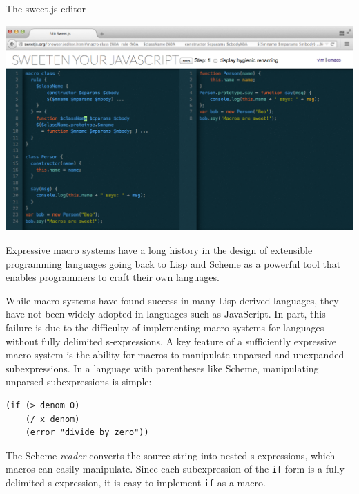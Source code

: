 \documentclass[preprint,10pt]{sigplanconf}
\begin{document}
\begin{displayfigure*}{\label{fig:editor}The sweet.js editor}

\centering
\includegraphics[scale=0.44]{sweetjs_browser.png}
\end{displayfigure*}

Expressive macro systems have a long history in the design of
extensible programming languages going back to Lisp and Scheme
\cite{Kohlbecker1987,Foderaro1983} as a powerful tool that enables
programmers to craft their own languages.

While macro systems have found success in many Lisp-derived languages,
they have not been widely adopted in languages such as JavaScript. In
part, this failure is due to the difficulty of implementing macro
systems for languages without fully delimited s-expressions. A key
feature of a sufficiently expressive macro system is the ability for
macros to manipulate unparsed and unexpanded subexpressions. In a
language with parentheses like Scheme, manipulating unparsed
subexpressions is simple:
\begin{lstlisting}
(if (> denom 0)
    (/ x denom)
    (error "divide by zero"))
\end{lstlisting}
The Scheme \emph{reader} converts the source string into nested
s-expressions, which macros can easily manipulate. Since each
subexpression of the \verb!if! form is a fully delimited
s-expression, it is easy to implement \verb!if! as a
macro.

\end{document}
